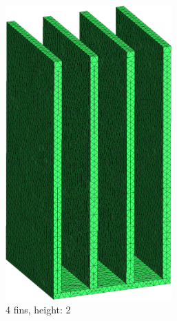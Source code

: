 \begin{figure}[h t!]
\begin{subfigure}[t] {0.23\textwidth}
 \includegraphics[width=0.7\textwidth]{"../figures/mesh_4_2 (new)"}
 \caption{4 fins, height: 2}
 \label{fig:mesh_4_2}
 \end{subfigure}
 ~
 \begin{subfigure}[t] {0.23\textwidth}
 \centering

\end{subfigure}
\end{figure}

